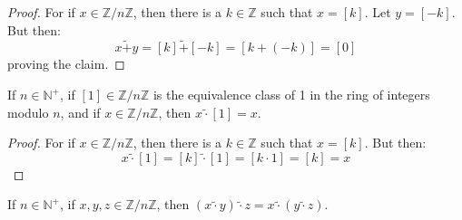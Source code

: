 \documentclass{article}                                                        %
\begin{document}
            \begin{proof}
                For if $x\in\mathbb{Z}/n\mathbb{Z}$, then there is a
                $k\in\mathbb{Z}$ such that $x=[k]$. Let $y=[\minus{k}]$. But
                then:
                \begin{equation}
                    x\tilde{+}y=[k]\tilde{+}[\minus{k}]
                    =[k+(\minus{k})]=[0]
                \end{equation}
                proving the claim.
            \end{proof}
            \begin{theorem}
                \label{thm:Equiv_Class_of_1_is_Mult_Identity_Mod_n}%
                If $n\in\mathbb{N}^{+}$, if $[1]\in\mathbb{Z}/n\mathbb{Z}$ is
                the equivalence class of 1 in the ring of integers modulo $n$,
                and if $x\in\mathbb{Z}/n\mathbb{Z}$, then $x\tilde{\cdot}[1]=x$.
            \end{theorem}
            \begin{proof}
                For if $x\in\mathbb{Z}/n\mathbb{Z}$, then there is a
                $k\in\mathbb{Z}$ such that $x=[k]$. But then:
                \begin{equation}
                    x\tilde{\cdot}[1]=[k]\tilde{\cdot}[1]=[k\cdot{1}]=[k]=x
                \end{equation}
            \end{proof}
            \begin{theorem}
                \label{thm:Mod_Mult_is_Assoc}%
                If $n\in\mathbb{N}^{+}$, if $x,y,z\in\mathbb{Z}/n\mathbb{Z}$,
                then $(x\tilde{\cdot}y)\tilde{\cdot}z%
                =x\tilde{\cdot}(y\tilde{\cdot}z)$.
            \end{theorem}
\end{document}
